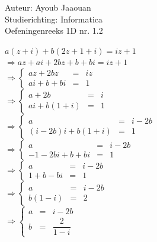 \documentclass[a4paper]{article}
\begin{document}
  
\noindent \large Auteur: Ayoub Jaaouan          \\
\noindent \large Studierichting: Informatica   \\ 
\noindent \large Oefeningenreeks 1D nr. 1.2   \\

\medskip

\normalsize

$ a(z+i) + b(2z+1+i) = iz +1 $\\

$ \Rightarrow az + ai + 2bz + b + bi = iz + 1 $\\

$\Rightarrow\left\{
	\begin{array}{lll} 
	    az+2bz &=& iz \\
		ai+b+bi &=& 1
	\end{array}
\right .$\\

$\Rightarrow\left\{
	\begin{array}{lll} 
	    a+2b &=& i \\
		ai+b(1+i) &=& 1
	\end{array}
\right .$\\

$\Rightarrow\left\{
	\begin{array}{lll} 
	    a &=& i-2b \\
		(i-2b)i+b(1+i) &=& 1
	\end{array}
\right .$\\

$\Rightarrow\left\{
	\begin{array}{lll} 
	    a &=& i-2b \\
		-1-2bi+b+bi &=& 1
	\end{array}
\right .$\\

$\Rightarrow\left\{
	\begin{array}{lll} 
	    a &=& i-2b \\
		1+b-bi &=& 1
	\end{array}
\right .$\\

$\Rightarrow\left\{
	\begin{array}{lll} 
	    a &=& i-2b \\
		b(1-i) &=& 2
	\end{array}
\right .$\\

$\Rightarrow\left\{
	\begin{array}{lll} 
	    a &=& i-2b \\
		b &=& \dfrac{2}{1-i}
	\end{array}
\right .$\\
\end{document}
